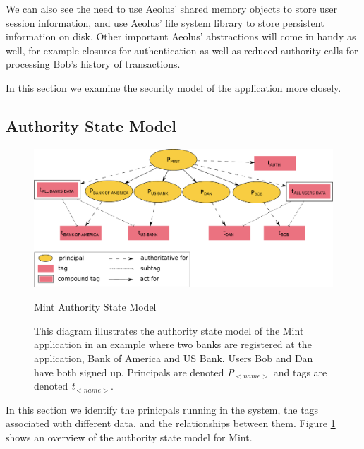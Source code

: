 We can also see the need to use Aeolus' shared memory objects to store user session information, and use Aeolus' file system library to store persistent information on disk. Other important Aeolus' abstractions will come in handy as well, for example closures for authentication as well as reduced authority calls for processing Bob's history of transactions.

In this section we examine the security model of the application more closely.

\subsection{Authority State Model}

\begin{figure}[h]
\centering
\includegraphics[width=\textwidth,height=\textheight,keepaspectratio]{figures/mint-auth-state-model}
\caption*{Mint Authority State Model}
\caption[Mint Authority State Model]{This diagram illustrates the authority state model of the Mint application in an example where two banks are registered at the application, Bank of America and US Bank. Users Bob and Dan have both signed up. Principals are denoted \emph{P$_{<name>}$} and tags are denoted \emph{t$_{<name>}$}.}
\label{fig:mint-auth-state-model}
\end{figure}


In this section we identify the prinicpals running in the system, the tags associated with different data, and the relationships between them. Figure \ref{fig:mint-auth-state-model} shows an overview of the authority state model for Mint.

